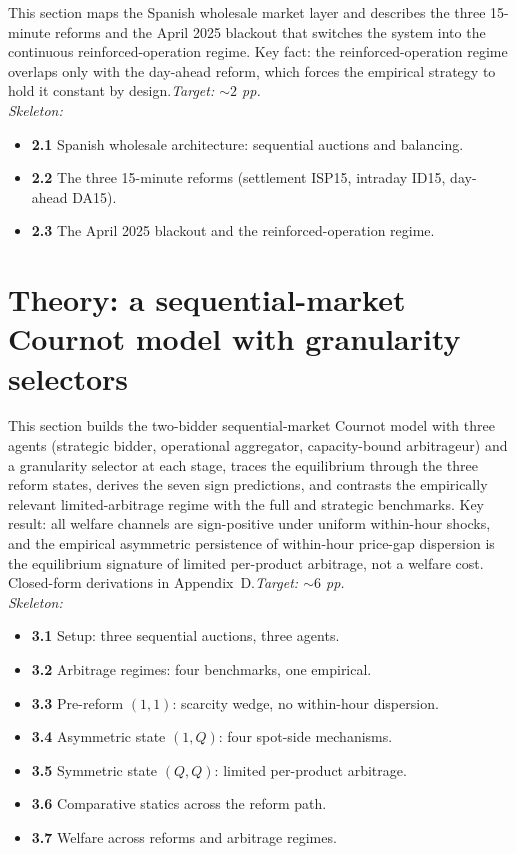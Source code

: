 \documentclass[11pt]{article}
\begin{document}
This section maps the Spanish wholesale market layer and describes the three 15-minute reforms and the April 2025 blackout that switches the system into the continuous reinforced-operation regime. Key fact: the reinforced-operation regime overlaps only with the day-ahead reform, which forces the empirical strategy to hold it constant by design.\hfill\emph{Target: $\sim 2$ pp.}
\\\emph{Skeleton:}
\begin{itemize}
  \item \textbf{2.1} Spanish wholesale architecture: sequential auctions and balancing.
  \item \textbf{2.2} The three 15-minute reforms (settlement ISP15, intraday ID15, day-ahead DA15).
  \item \textbf{2.3} The April 2025 blackout and the reinforced-operation regime.
\end{itemize}

\section{Theory: a sequential-market Cournot model with granularity selectors}

This section builds the two-bidder sequential-market Cournot model with three agents (strategic bidder, operational aggregator, capacity-bound arbitrageur) and a granularity selector at each stage, traces the equilibrium through the three reform states, derives the seven sign predictions, and contrasts the empirically relevant limited-arbitrage regime with the full and strategic benchmarks. Key result: all welfare channels are sign-positive under uniform within-hour shocks, and the empirical asymmetric persistence of within-hour price-gap dispersion is the equilibrium signature of limited per-product arbitrage, not a welfare cost. Closed-form derivations in Appendix~D.\hfill\emph{Target: $\sim 6$ pp.}
\\\emph{Skeleton:}
\begin{itemize}
  \item \textbf{3.1} Setup: three sequential auctions, three agents.
  \item \textbf{3.2} Arbitrage regimes: four benchmarks, one empirical.
  \item \textbf{3.3} Pre-reform $(1,1)$: scarcity wedge, no within-hour dispersion.
  \item \textbf{3.4} Asymmetric state $(1,Q)$: four spot-side mechanisms.
  \item \textbf{3.5} Symmetric state $(Q,Q)$: limited per-product arbitrage.
  \item \textbf{3.6} Comparative statics across the reform path.
  \item \textbf{3.7} Welfare across reforms and arbitrage regimes.
\end{itemize}
\end{document}
